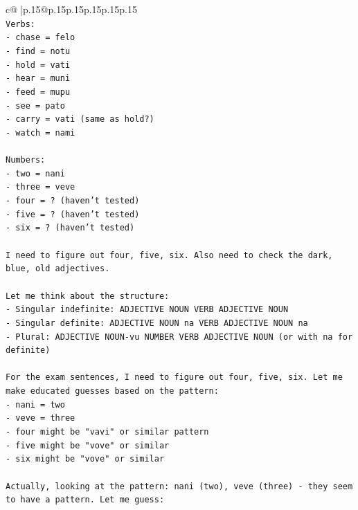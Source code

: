 \documentclass{article}
\begin{document}
{\begin{supertabular}{c@{$\;$}|p{.15\linewidth}@{}p{.15\linewidth}p{.15\linewidth}p{.15\linewidth}p{.15\linewidth}p{.15\linewidth}}
{{{\\ 
\texttt{Verbs:} \\
\texttt{{-} chase = felo} \\
\texttt{{-} find = notu} \\
\texttt{{-} hold = vati} \\
\texttt{{-} hear = muni} \\
\texttt{{-} feed = mupu} \\
\texttt{{-} see = pato} \\
\texttt{{-} carry = vati (same as hold?)} \\
\texttt{{-} watch = nami} \\
\\ 
\texttt{Numbers:} \\
\texttt{{-} two = nani} \\
\texttt{{-} three = veve} \\
\texttt{{-} four = ? (haven't tested)} \\
\texttt{{-} five = ? (haven't tested)} \\
\texttt{{-} six = ? (haven't tested)} \\
\\ 
\texttt{I need to figure out four, five, six. Also need to check the dark, blue, old adjectives.} \\
\\ 
\texttt{Let me think about the structure:} \\
\texttt{{-} Singular indefinite: ADJECTIVE NOUN VERB ADJECTIVE NOUN} \\
\texttt{{-} Singular definite: ADJECTIVE NOUN na VERB ADJECTIVE NOUN na} \\
\texttt{{-} Plural: ADJECTIVE NOUN{-}vu NUMBER VERB ADJECTIVE NOUN (or with na for definite)} \\
\\ 
\texttt{For the exam sentences, I need to figure out four, five, six. Let me make educated guesses based on the pattern:} \\
\texttt{{-} nani = two} \\
\texttt{{-} veve = three} \\
\texttt{{-} four might be "vavi" or similar pattern} \\
\texttt{{-} five might be "vove" or similar} \\
\texttt{{-} six might be "vove" or similar} \\
\\ 
\texttt{Actually, looking at the pattern: nani (two), veve (three) {-} they seem to have a pattern. Let me guess:} \\
}}}
\end{supertabular}}
\end{document}
